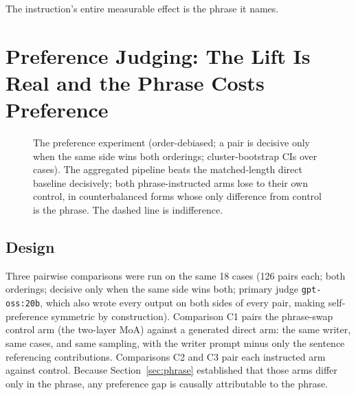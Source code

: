 \documentclass[11pt]{article}
\begin{document}
The instruction's entire measurable effect is the phrase it names.

\section{Preference Judging: The Lift Is Real and the Phrase Costs
Preference}
\label{sec:pref}

\begin{figure}[t]
\centering
{}
\caption{The preference experiment (order-debiased; a pair is decisive
only when the same side wins both orderings; cluster-bootstrap CIs over
cases). The aggregated pipeline beats the matched-length direct
baseline decisively; both phrase-instructed arms lose to their own
control, in counterbalanced forms whose only difference from control is
the phrase. The dashed line is indifference.}
\label{fig:pref}
\end{figure}

\subsection{Design}

Three pairwise comparisons were run on the same 18 cases (126 pairs
each; both orderings; decisive only when the same side wins both;
primary judge \texttt{gpt-oss:20b}, which also wrote every output on
both sides of every pair, making self-preference symmetric by
construction). Comparison C1 pairs the phrase-swap control arm (the
two-layer MoA) against a generated direct arm: the same writer, same
cases, and same sampling, with the writer prompt minus only the
sentence referencing contributions. Comparisons C2 and C3 pair each
instructed arm against control. Because Section~\ref{sec:phrase}
established that those arms differ only in the phrase, any preference
gap is causally attributable to the phrase.
\end{document}
